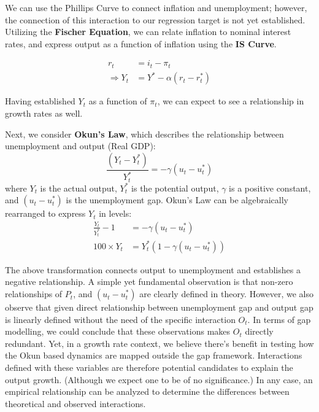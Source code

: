 \vspace{\baselineskip}

We can use the Phillips Curve to connect inflation and unemployment; however, the connection of this interaction to our regression target is not yet established.
Utilizing the \textbf{Fischer Equation}, we can relate inflation to nominal interest rates, and express output as a function of inflation using the \textbf{IS Curve}.

\begin{equation}
    \begin{aligned}
        r_t &= i_t - \pi_t \\
        \Rightarrow Y_t &= Y^* - \alpha(r_t - r_t^*)
    \end{aligned}
    \label{eq:fischer_output}
\end{equation}

\noindent Having established $Y_t$ as a function of $\pi_t$, we can expect to see a relationship in growth rates as well.

\vspace{\baselineskip}

Next, we consider \textbf{Okun's Law}, which describes the relationship between unemployment and output (Real GDP):
\begin{equation}
    \frac{(Y_t-Y_t^*)}{Y_t^*} = -\gamma(u_t - u_t^*)
    \label{eq:okuns_law}
\end{equation}
where $Y_t$ is the actual output, $Y_t^*$ is the potential output, $\gamma$ is a positive constant, and $(u_t - u_t^*)$ is the unemployment gap.
Okun's Law can be algebraically rearranged to express $Y_t$ in levels:
\begin{equation}
    \begin{aligned}
        \frac{Y_t}{Y_t^*} - 1 &= -\gamma(u_t - u_t^*) \\
        100\times Y_t &= Y_t^*(1 - \gamma(u_t - u_t^*))
    \end{aligned}
    \label{eq:okuns_levels}
\end{equation}

\vspace{\baselineskip}

\noindent The above transformation connects output to unemployment and establishes a negative relationship.
A simple yet fundamental observation is that non-zero relationships of $P_t$, and $(u_t - u_t^*)$ are clearly defined in theory.
However, we also observe that given direct relationship between unemployment gap and output gap is linearly defined without the need of the specific interaction $O_t$.
In terms of gap modelling, we could conclude that these observations makes $O_t$ directly redundant.
Yet, in a growth rate context, we believe there's benefit in testing how the Okun based dynamics are mapped outside the gap framework.
Interactions defined with these variables are therefore potential candidates to explain the output growth. (Although we expect one to be of no significance.)
In any case, an empirical relationship can be analyzed to determine the differences between theoretical and observed interactions.

